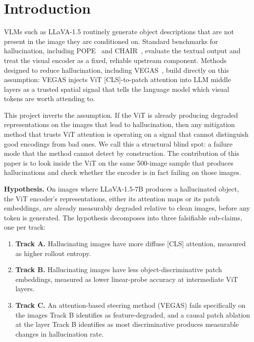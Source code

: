\documentclass[11pt]{article}
\begin{document}
\section{Introduction}

VLMs such as LLaVA-1.5 routinely generate object descriptions that are not present in
the image they are conditioned on. Standard benchmarks for hallucination, including
POPE~\cite{li2023pope} and CHAIR~\cite{rohrbach2018chair}, evaluate the textual output
and treat the visual encoder as a fixed, reliable upstream component. Methods designed
to reduce hallucination, including VEGAS~\cite{seo2024vegas}, build directly on this
assumption: VEGAS injects ViT [CLS]-to-patch attention into LLM middle layers as a
trusted spatial signal that tells the language model which visual tokens are worth
attending to.

This project inverts the assumption. If the ViT is already producing degraded
representations on the images that lead to hallucination, then any mitigation method
that trusts ViT attention is operating on a signal that cannot distinguish good
encodings from bad ones. We call this a structural blind spot: a failure mode that the
method cannot detect by construction. The contribution of this paper is to look inside
the ViT on the same 500-image sample that produces hallucinations and check whether the
encoder is in fact failing on those images.

\textbf{Hypothesis.} On images where LLaVA-1.5-7B produces a hallucinated object, the
ViT encoder's representations, either its attention maps or its patch embeddings, are
already measurably degraded relative to clean images, before any token is generated.
The hypothesis decomposes into three falsifiable sub-claims, one per track:
\begin{enumerate}
  \item \textbf{Track A.} Hallucinating images have more diffuse [CLS] attention,
        measured as higher rollout entropy.
  \item \textbf{Track B.} Hallucinating images have less object-discriminative patch
        embeddings, measured as lower linear-probe accuracy at intermediate ViT layers.
  \item \textbf{Track C.} An attention-based steering method (VEGAS) fails specifically
        on the images Track B identifies as feature-degraded, and a causal patch
        ablation at the layer Track B identifies as most discriminative produces
        measurable changes in hallucination rate.
\end{enumerate}
\end{document}
